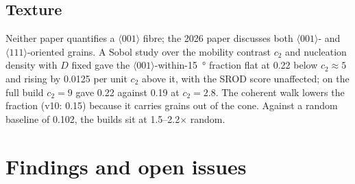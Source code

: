 \documentclass[11pt,a4paper]{article}
\newcommand{\dir}[1]{$\langle #1 \rangle$}
\begin{document}
\subsection{Texture}
Neither paper quantifies a \dir{001} fibre; the 2026 paper discusses both \dir{001}- and \dir{111}-oriented grains. A Sobol study over the mobility contrast $c_2$ and nucleation density with $D$ fixed gave the \dir{001}-within-\SI{15}{\degree} fraction flat at 0.22 below $c_2 \approx 5$ and rising by 0.0125 per unit $c_2$ above it, with the SROD score unaffected; on the full build $c_2 = 9$ gave 0.22 against 0.19 at $c_2 = 2.8$. The coherent walk lowers the fraction (v10: 0.15) because it carries grains out of the cone. Against a random baseline of 0.102, the builds sit at 1.5--2.2$\times$ random.

\section{Findings and open issues}
\end{document}
